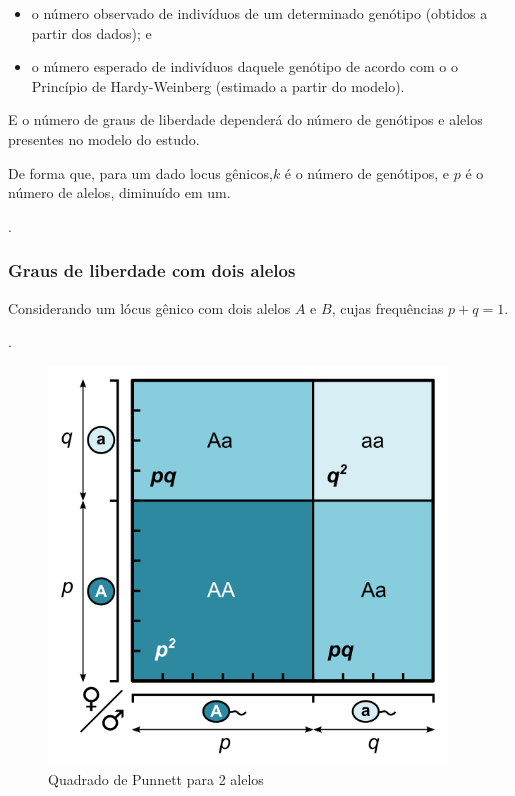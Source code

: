 \documentclass[
]{book}
\begin{document}
\begin{itemize}
\item
  o número observado de indivíduos de um determinado genótipo (obtidos a partir dos dados); e
\item
  o número esperado de indivíduos daquele genótipo de acordo com o o Princípio de Hardy-Weinberg (estimado a partir do modelo).
\end{itemize}

E o número de graus de liberdade dependerá do número de genótipos e alelos presentes no modelo do estudo.

De forma que, para um dado locus gênicos,\(k\) é o número de genótipos, e \(p\) é o número de alelos, diminuído em um.

.\linebreak

\hypertarget{graus-de-liberdade-com-dois-alelos}{%
\subsubsection{Graus de liberdade com dois alelos}\label{graus-de-liberdade-com-dois-alelos}}

Considerando um lócus gênico com dois alelos \(A\) e \(B\), cujas frequências \(p+q=1\).

.\linebreak

\begin{figure}

{\centering \includegraphics[width=400px]{figs/punnett_2alelles} 

}

\caption{Quadrado de Punnett para 2 alelos}\label{fig:gl2alelos}
\end{figure}
\end{document}
